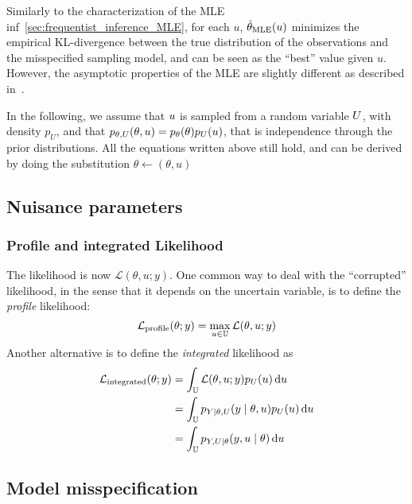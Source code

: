 \documentclass[../../Main_ManuscritThese.tex]{subfiles}
\begin{document}
Similarly to the characterization of the MLE inf~\cref{sec:frequentist_inference_MLE}, for each $u$, $\hat{\theta}_{\mathrm{MLE}}(u)$ minimizes the empirical KL-divergence between the true distribution of the observations and the misspecified sampling model, and can be seen as the ``best'' value given $u$. However, the asymptotic properties of the MLE are slightly different as described in~\cite{white_maximum_1982}.


In the following, we assume that $u$ is sampled from a random variable $U$, with density $p_U$, and that $p_{\theta,U}(\theta,u) = p_{\theta}(\theta) p_{U}(u)$, that is independence through the prior distributions.
All the equations written above still hold, and can be derived by doing the substitution $\theta \gets (\theta,u)$

\subsection{Nuisance parameters}
\label{sec:nuisance_parameters}
\cite{berger_integrated_1999}
\subsubsection{Profile and integrated Likelihood}

The likelihood is now $\mathcal{L}(\theta, u ;y)$. One common way to deal with the ``corrupted'' likelihood, in the sense that it depends on the uncertain variable, is to define the \emph{profile} likelihood:
\begin{equation}
  \label{eq:eq:def_profile_lik}
  \mathcal{L}_{\mathrm{profile}}(\theta;y) = \max_{u \in \mathbb{U}} \mathcal{L}(\theta,u;y)
\end{equation}
Another alternative is to define the \emph{integrated} likelihood as
\begin{align}
  \mathcal{L}_{\mathrm{integrated}}(\theta;y) &= \int_{\mathbb{U}} \mathcal{L}(\theta,u;y) p_{U}(u) \,\mathrm{d}u \\
                                              &=\int_{\mathbb{U}} p_{Y|\theta,U}(y \mid \theta,u) p_{U}(u) \,\mathrm{d}u \\
                                              &=\int_{\mathbb{U}} p_{Y,U|\theta}(y,u \mid \theta)\,\mathrm{d}u \\
\end{align}



\subsection{Model misspecification}






\subfileLocal{
	\pagestyle{empty}
	
	
}
\end{document}
